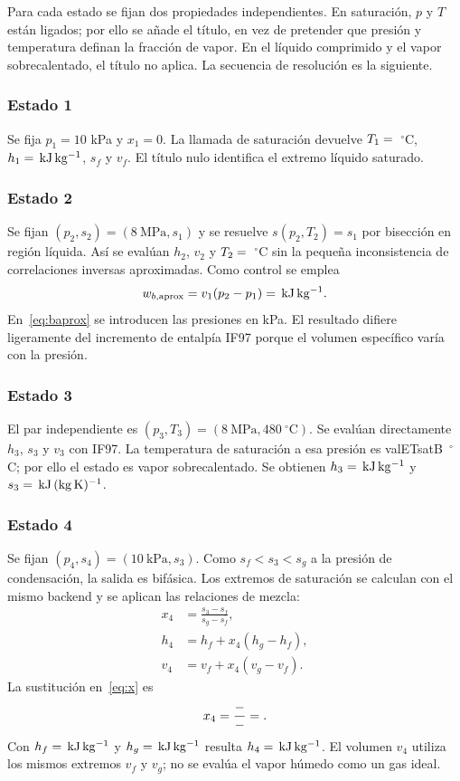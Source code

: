 \documentclass[conference,a4paper,11pt]{IEEEtran}
\newcommand{\V}[1]{\csname val#1\endcsname}
\newcommand{\kj}{\,\mathrm{kJ\,kg^{-1}}}
\newcommand{\skj}{\,\mathrm{kJ\,(kg\,K)^{-1}}}
\begin{document}
Para cada estado se fijan dos propiedades independientes. En saturación, $p$ y $T$ están ligados; por ello se añade el título, en vez de pretender que presión y temperatura definan la fracción de vapor. En el líquido comprimido y el vapor sobrecalentado, el título no aplica. La secuencia de resolución es la siguiente.

\subsubsection{Estado 1}
Se fija $p_1=10$ kPa y $x_1=0$. La llamada de saturación devuelve $T_1=\V{IT1}$~$^\circ$C, $h_1=\V{Ih1}\kj$, $s_f$ y $v_f$. El título nulo identifica el extremo líquido saturado.

\subsubsection{Estado 2}
Se fijan $(p_2,s_2)=(8\ \mathrm{MPa},s_1)$ y se resuelve $s(p_2,T_2)=s_1$ por bisección en región líquida. Así se evalúan $h_2$, $v_2$ y $T_2=\V{IT2}$~$^\circ$C sin la pequeña inconsistencia de correlaciones inversas aproximadas. Como control se emplea
\begin{equation}
w_{b,\rm aprox}=v_1(p_2-p_1)=\V{Epump_approx}\kj.
\label{eq:baprox}
\end{equation}
En~\eqref{eq:baprox} se introducen las presiones en kPa. El resultado difiere ligeramente del incremento de entalpía IF97 porque el volumen específico varía con la presión.

\subsubsection{Estado 3}
El par independiente es $(p_3,T_3)=(8\ \mathrm{MPa},480~^\circ\mathrm C)$. Se evalúan directamente $h_3$, $s_3$ y $v_3$ con IF97. La temperatura de saturación a esa presión es \V{ETsatB}~$^\circ$C; por ello el estado es vapor sobrecalentado. Se obtienen $h_3=\V{Ih3}\kj$ y $s_3=\V{Is3}\skj$.

\subsubsection{Estado 4}
Se fijan $(p_4,s_4)=(10\ \mathrm{kPa},s_3)$. Como $s_f<s_3<s_g$ a la presión de condensación, la salida es bifásica. Los extremos de saturación se calculan con el mismo backend y se aplican las relaciones de mezcla:
\begin{align}
x_4&=\frac{s_3-s_f}{s_g-s_f},\label{eq:x}\\
h_4&=h_f+x_4(h_g-h_f),\label{eq:h4}\\
v_4&=v_f+x_4(v_g-v_f).\label{eq:v4}
\end{align}
La sustitución en~\eqref{eq:x} es
\begin{equation}
x_4=\frac{\V{Is3}-\V{EsfC}}{\V{EsgC}-\V{EsfC}}=\V{Ix4}.
\label{eq:xnum}
\end{equation}
Con $h_f=\V{EhfC}\kj$ y $h_g=\V{EhgC}\kj$ resulta $h_4=\V{Ih4}\kj$. El volumen $v_4$ utiliza los mismos extremos $v_f$ y $v_g$; no se evalúa el vapor húmedo como un gas ideal.
\end{document}
